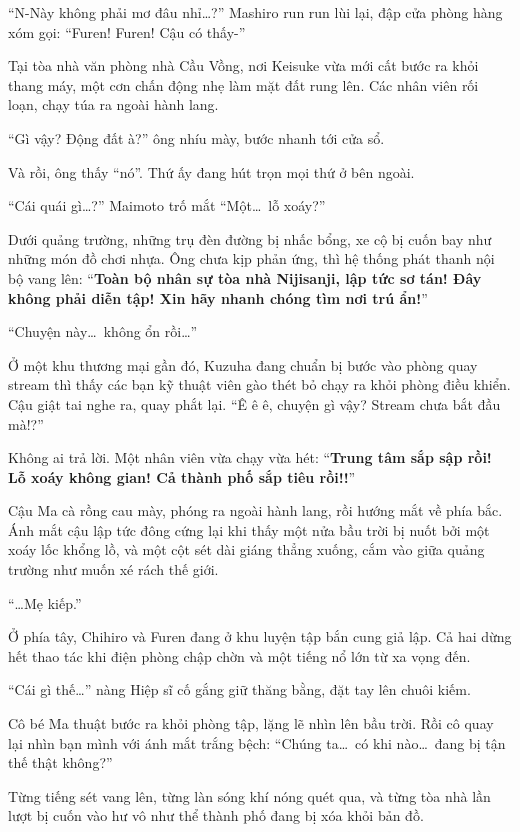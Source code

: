 \documentclass[../main.tex]{subfiles}
\begin{document}
``N-Này không phải mơ đâu nhỉ\dots?'' Mashiro run run lùi lại, đập cửa phòng hàng xóm gọi: ``Furen! Furen! Cậu có thấy-''

Tại tòa nhà văn phòng nhà Cầu Vồng, nơi Keisuke vừa mới cất bước ra khỏi thang máy, một cơn chấn động nhẹ làm mặt đất rung lên. Các nhân viên rối loạn, chạy túa ra ngoài hành lang.

``Gì vậy? Động đất à?'' ông nhíu mày, bước nhanh tới cửa sổ.

Và rồi, ông thấy ``nó''. Thứ ấy đang hút trọn mọi thứ ở bên ngoài.

``Cái quái gì\dots?'' Maimoto trố mắt ``Một\dots\ lỗ xoáy?''

Dưới quảng trường, những trụ đèn đường bị nhấc bổng, xe cộ bị cuốn bay như những món đồ chơi nhựa. Ông chưa kịp phản ứng, thì hệ thống phát thanh nội bộ vang lên: ``\textbf{Toàn bộ nhân sự tòa nhà Nijisanji, lập tức sơ tán! Đây không phải diễn tập! Xin hãy nhanh chóng tìm nơi trú ẩn!}''

``Chuyện này\dots\ không ổn rồi\dots''

Ở một khu thương mại gần đó, Kuzuha đang chuẩn bị bước vào phòng quay stream thì thấy các bạn kỹ thuật viên gào thét bỏ chạy ra khỏi phòng điều khiển. Cậu giật tai nghe ra, quay phắt lại. ``Ê ê ê, chuyện gì vậy? Stream chưa bắt đầu mà!?''

Không ai trả lời. Một nhân viên vừa chạy vừa hét: ``\textbf{Trung tâm sắp sập rồi! Lỗ xoáy không gian! Cả thành phố sắp tiêu rồi!!}''

Cậu Ma cà rồng cau mày, phóng ra ngoài hành lang, rồi hướng mắt về phía bắc. Ánh mắt cậu lập tức đông cứng lại khi thấy một nửa bầu trời bị nuốt bởi một xoáy lốc khổng lồ, và một cột sét dài giáng thẳng xuống, cắm vào giữa quảng trường như muốn xé rách thế giới.

``\dots Mẹ kiếp.''

Ở phía tây, Chihiro và Furen đang ở khu luyện tập bắn cung giả lập. Cả hai dừng hết thao tác khi điện phòng chập chờn và một tiếng nổ lớn từ xa vọng đến.

``Cái gì thế\dots'' nàng Hiệp sĩ cố gắng giữ thăng bằng, đặt tay lên chuôi kiếm.

Cô bé Ma thuật bước ra khỏi phòng tập, lặng lẽ nhìn lên bầu trời. Rồi cô quay lại nhìn bạn mình với ánh mắt trắng bệch: ``Chúng ta\dots\ có khi nào\dots\ đang bị tận thế thật không?''

Từng tiếng sét vang lên, từng làn sóng khí nóng quét qua, và từng tòa nhà lần lượt bị cuốn vào hư vô như thể thành phố đang bị xóa khỏi bản đồ.
\end{document}
